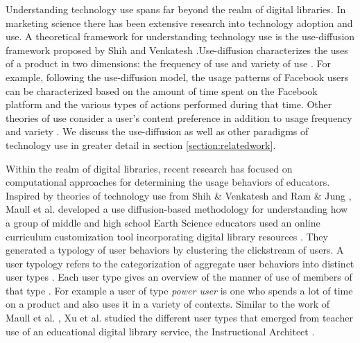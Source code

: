 \documentclass{acm_proc_article-sp}
\begin{document}
Understanding technology use spans far beyond the realm of digital libraries. In marketing science there has been extensive research into technology adoption and use. A  theoretical framework for understanding technology use is the use-diffusion framework proposed by Shih and Venkatesh \cite{shih2004beyond}.Use-diffusion characterizes the uses of a product in two dimensions: the frequency of use and variety of use \cite{shih2004beyond}.  For example, following the use-diffusion model, the usage patterns of Facebook users can be characterized based on the amount of time spent on the Facebook platform and the various types of actions performed during that time. Other theories of use consider a user's content preference in addition to usage frequency and variety \cite{brandtzaeg2010towards}. We discuss the use-diffusion as well as other paradigms of technology use in greater detail in section \ref{section:relatedwork}. 

Within the realm of digital libraries, recent research has focused on computational approaches for determining the usage behaviors of educators. Inspired by theories of technology use from Shih \& Venkatesh and Ram \& Jung \cite{shih2004beyond, ram1990conceptualization}, Maull et al. developed a use diffusion-based methodology for understanding how a group of middle and high school Earth Science educators used an online curriculum customization tool incorporating digital library resources \cite{maullunderstanding}. They generated a typology of user behaviors by clustering the clickstream of users. A user typology refers to the categorization of aggregate user behaviors into distinct user types \cite{brandtzaeg2010towards}. Each user type gives an overview of the manner of use of members of that type \cite{brandtzaeg2010towards}. For example a user of type \textit{power user} is one who spends a lot of time on a product and also uses it in a variety of contexts. Similar to the work of Maull et al. \cite{maullunderstanding}, Xu et al. studied the different  user types that emerged from teacher use of an educational digital library service, the Instructional Architect \cite{xu}. 
\end{document}
